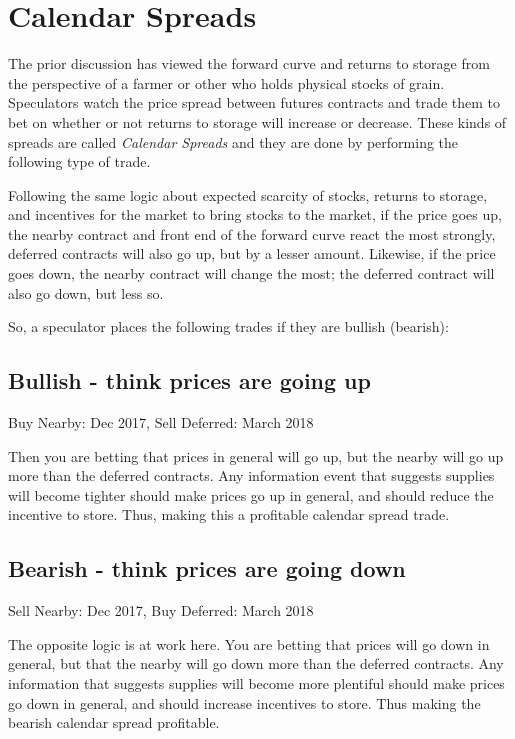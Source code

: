 \documentclass[
]{book}
\begin{document}
\hypertarget{calendar-spreads}{%
\section{Calendar Spreads}\label{calendar-spreads}}

The prior discussion has viewed the forward curve and returns to storage from the perspective of a farmer or other who holds physical stocks of grain. Speculators watch the price spread between futures contracts and trade them to bet on whether or not returns to storage will increase or decrease. These kinds of spreads are called \emph{Calendar Spreads} and they are done by performing the following type of trade.

Following the same logic about expected scarcity of stocks, returns to storage, and incentives for the market to bring stocks to the market, if the price goes up, the nearby contract and front end of the forward curve react the most strongly, deferred contracts will also go up, but by a lesser amount. Likewise, if the price goes down, the nearby contract will change the most; the deferred contract will also go down, but less so.

So, a speculator places the following trades if they are bullish (bearish):

\hypertarget{bullish---think-prices-are-going-up}{%
\subsection{Bullish - think prices are going up}\label{bullish---think-prices-are-going-up}}

Buy Nearby: Dec 2017,
Sell Deferred: March 2018

Then you are betting that prices in general will go up, but the nearby will go up more than the deferred contracts. Any information event that suggests supplies will become tighter should make prices go up in general, and should reduce the incentive to store. Thus, making this a profitable calendar spread trade.

\hypertarget{bearish---think-prices-are-going-down}{%
\subsection{Bearish - think prices are going down}\label{bearish---think-prices-are-going-down}}

Sell Nearby: Dec 2017,
Buy Deferred: March 2018

The opposite logic is at work here. You are betting that prices will go down in general, but that the nearby will go down more than the deferred contracts. Any information that suggests supplies will become more plentiful should make prices go down in general, and should increase incentives to store. Thus making the bearish calendar spread profitable.
\end{document}
